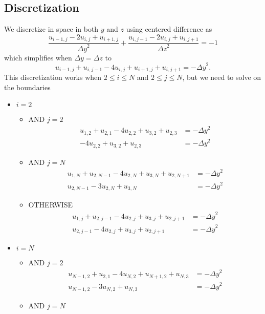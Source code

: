 \documentclass[11pt]{article}
\begin{document}
	\subsection{Discretization}
	We discretize in space in both $ y $ and $ z $ using centered difference as
	\begin{equation}
		\frac{u_{i-1,j} - 2u_{i,j} + u_{i+1,j}}{{\Delta y}^2} + \frac{u_{i,j-1} - 2u_{i,j} + u_{i,j+1}}{{\Delta z}^2} = -1
	\end{equation}
	which simplifies when $ \Delta y = \Delta z $ to
	\begin{equation}
		u_{i-1,j} + u_{i,j-1} - 4u_{i,j} + u_{i+1,j} + u_{i,j+1} = -{\Delta y}^2.
	\end{equation}
	This discretization works when $ 2\leq i\leq N $ and $ 2\leq j\leq N $, but we need to solve on the boundaries
	\begin{itemize}
		\item $ i = 2 $
		\begin{itemize}
			\item AND $ j = 2 $
			\begin{align*}
				u_{1,2} + u_{2,1} - 4u_{2,2} + u_{3,2} + u_{2,3} &= -{\Delta y}^2\\
				- 4u_{2,2} + u_{3,2} + u_{2,3} &= -{\Delta y}^2
			\end{align*}
			\item AND $ j = N $
			\begin{align*}
				u_{1,N} + u_{2,N-1} - 4u_{2,N} + u_{3,N} + u_{2,N+1} &= -{\Delta y}^2\\
				u_{2,N-1} - 3u_{2,N} + u_{3,N} &= -{\Delta y}^2
			\end{align*}
			\item OTHERWISE
			\begin{align*}
				u_{1,j} + u_{2,j-1} - 4u_{2,j} + u_{3,j} + u_{2,j+1} &= -{\Delta y}^2\\
				u_{2,j-1} - 4u_{2,j} + u_{3,j} + u_{2,j+1} &= -{\Delta y}^2
			\end{align*}
		\end{itemize}
		\item $ i = N $
		\begin{itemize}
			\item AND $ j = 2 $
			\begin{align*}
				u_{N-1,2} + u_{2,1} - 4u_{N,2} + u_{N+1,2} + u_{N,3} &= -{\Delta y}^2\\
				u_{N-1,2} - 3u_{N,2} + u_{N,3} &= -{\Delta y}^2
			\end{align*}
			\item AND $ j = N $

\end{itemize}
\end{itemize}
\end{document}
